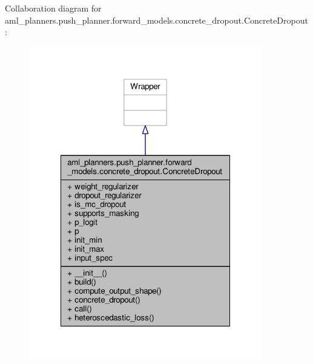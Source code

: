 Collaboration diagram for aml\-\_\-planners.\-push\-\_\-planner.\-forward\-\_\-models.\-concrete\-\_\-dropout.\-Concrete\-Dropout\-:\nopagebreak
\begin{figure}[H]
\begin{center}
\leavevmode
\includegraphics[width=288pt]{classaml__planners_1_1push__planner_1_1forward__models_1_1concrete__dropout_1_1_concrete_dropout__coll__graph}
\end{center}
\end{figure}
